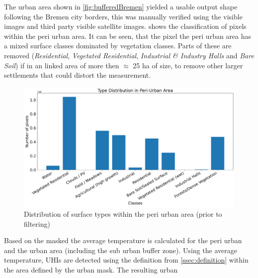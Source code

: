 \documentclass[12pt,a4paper, english,twoside]{scrartcl}
\begin{document}
   The urban area shown in \cref{fig:bufferedBremen} yielded a usable output shape following the Bremen city borders, this was manually verified using the visible images and third party visible satellite images. 
    shows the classification of pixels within the peri urban area.
   It can be seen, that the pixel the peri urban area has a mixed surface classes dominated by vegetation classes. 
   Parts of these are removed (\textit{Residential}, \textit{Vegetated Residential}, \textit{Industrial \& Industry Halls} and \textit{Bare Soil}) if in an linked area of more then $\approx$ 25 ha of size, to remove other larger settlements that could distort the measurement.
%
        \begin{figure}[!htbp]
         \centering
         \includegraphics[width=\textwidth]{img/ClassDistributionPU2019-06-29.png}
         \caption{Distribution of surface types within the peri urban area (prior to filtering)}\label{fig:classesPeri}
        \end{figure}
        Based on the masked the average temperature is calculated for the peri urban and the urban area (including the sub urban buffer zone). 
        Using the average temperature, \glspl{UHI} are detected using the definition from \cref{ssec:definition} within the area defined by the urban mask. 
        The resulting urban
\end{document}
